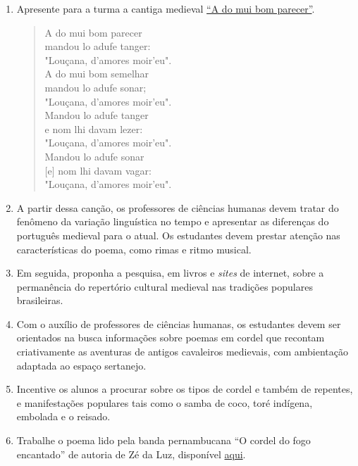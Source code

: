 \documentclass[12pt]{extarticle}
\begin{document}
\begin{enumerate}

\item Apresente para a turma a cantiga medieval
  \href{https://cantigas.fcsh.unl.pt/versaomusical.asp?cdcant=1307&cdvm=247}{``A
do mui bom parecer''}.

\begin{verse} A do mui bom parecer\\ mandou lo adufe tanger:\\ \quad "Louçana,
  d'amores moir'eu".\\ A do mui bom semelhar\\ mandou lo adufe sonar;\\ \quad
  "Louçana, d'amores moir'eu".\\ Mandou lo adufe tanger\\ e nom lhi davam
  lezer:\\ \quad "Louçana, d'amores moir'eu".\\ Mandou lo adufe sonar\\ $[$e$]$
nom lhi davam vagar:\\ \quad "Louçana, d'amores moir'eu".  \end{verse}

\item A partir dessa canção, os professores de ciências humanas devem tratar do
  fenômeno da variação linguística no tempo e apresentar as diferenças do
  português medieval para o atual. Os estudantes devem prestar atenção nas
  características do poema, como rimas e ritmo musical.
  
\item Em seguida, proponha a pesquisa, em livros e \emph{sites} de internet,
  sobre a permanência do repertório cultural medieval nas tradições populares
  brasileiras.

\item  Com o auxílio de professores de ciências humanas, os estudantes devem
  ser orientados na busca informações sobre poemas em cordel que recontam
  criativamente as aventuras de antigos cavaleiros medievais, com ambientação
  adaptada ao espaço sertanejo. 

\item Incentive os alunos a procurar sobre os tipos de cordel e também de
  repentes, e manifestações populares tais como o samba de coco, toré indígena,
  embolada e o reisado. 

\item Trabalhe o poema lido pela banda pernambucana ``O cordel do fogo
  encantado'' de autoria de Zé da Luz, disponível
  \href{https://youtu.be/8NBauvFV6bo}{aqui}.


\end{enumerate}
\end{document}
